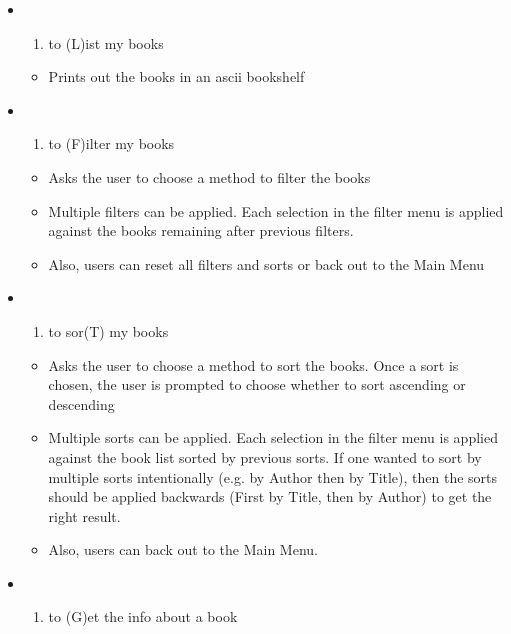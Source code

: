 \documentclass[11pt]{article}
\providecommand{\tightlist}{%
      \setlength{\itemsep}{0pt}\setlength{\parskip}{0pt}}
\begin{document}
\begin{enumerate}
  \begin{itemize}
  \item
    \begin{enumerate}
    \def\labelenumii{(\Alph{enumii})}
    \setcounter{enumii}{11}
    \tightlist
    \item
      to (L)ist my books
    \end{enumerate}

    \begin{itemize}
    \tightlist
    \item
      Prints out the books in an ascii bookshelf
    \end{itemize}
  \item
    \begin{enumerate}
    \def\labelenumii{(\Alph{enumii})}
    \setcounter{enumii}{5}
    \tightlist
    \item
      to (F)ilter my books
    \end{enumerate}

    \begin{itemize}
    \tightlist
    \item
      Asks the user to choose a method to filter the books
    \item
      Multiple filters can be applied. Each selection in the filter menu
      is applied against the books remaining after previous filters.
    \item
      Also, users can reset all filters and sorts or back out to the
      Main Menu
    \end{itemize}
  \item
    \begin{enumerate}
    \def\labelenumii{(\Alph{enumii})}
    \setcounter{enumii}{19}
    \tightlist
    \item
      to sor(T) my books
    \end{enumerate}

    \begin{itemize}
    \tightlist
    \item
      Asks the user to choose a method to sort the books. Once a sort is
      chosen, the user is prompted to choose whether to sort ascending
      or descending
    \item
      Multiple sorts can be applied. Each selection in the filter menu
      is applied against the book list sorted by previous sorts. If one
      wanted to sort by multiple sorts intentionally (e.g. by Author
      then by Title), then the sorts should be applied backwards (First
      by Title, then by Author) to get the right result.
    \item
      Also, users can back out to the Main Menu.
    \end{itemize}
  \item
    \begin{enumerate}
    \def\labelenumii{(\Alph{enumii})}
    \setcounter{enumii}{6}
    \tightlist
    \item
      to (G)et the info about a book
    \end{enumerate}


\end{itemize}
\end{enumerate}
\end{document}
